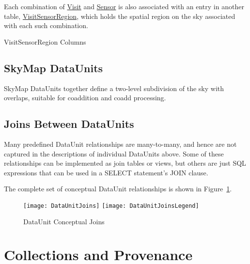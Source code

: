 \documentclass[DM,toc]{lsstdoc}
\newcommand{\tblref}[1]{\hyperref[tbl:#1]{#1}}
\newcommand{\unitref}[1]{\hyperref[unit:#1]{#1}}
\newcommand{\coltable}[1]{
    \begin{table}[htb]
        {
            \footnotesize
            
        }
        \caption{#1 Columns}
        \label{tbl:#1}
    \end{table}
}
\newcommand{\unitinc}[1]{}
\newcommand{\joininc}[1]{}
\begin{document}
Each combination of \unitref{Visit} and \unitref{Sensor} is also associated with an entry in another table, \tblref{VisitSensorRegion}, which holds the spatial region on the sky associated with each such combination.

\unitinc{Camera}
\unitinc{PhysicalFilter}
\unitinc{Sensor}
\unitinc{Exposure}
\unitinc{Visit}
\coltable{VisitSensorRegion}
\unitinc{ExposureRange}

\subsection{SkyMap DataUnits}
\label{sec:skymap-dataunits}

SkyMap DataUnits together define a two-level subdivision of the sky with overlaps, suitable for coaddition and coadd processing.

\unitinc{SkyMap}
\unitinc{Tract}
\unitinc{Patch}

\subsection{Joins Between DataUnits}
\label{sec:joins-between-dataunits}

Many predefined DataUnit relationships are many-to-many, and hence are not captured in the descriptions of individual DataUnits above.
Some of these relationships can be implemented as join tables or views, but others are just SQL expressions that can be used in a SELECT statement's JOIN clause.

The complete set of conceptual DataUnit relationships is shown in Figure~\ref{fig:DataUnitJoins}.

\begin{figure}
    \centering
    \texttt{[image: DataUnitJoins]}
    \texttt{[image: DataUnitJoinsLegend]}
    \caption{DataUnit Conceptual Joins}
    \label{fig:DataUnitJoins}
\end{figure}

\joininc{ExposureRangeJoin}
\joininc{MultiCameraExposureJoin}
\joininc{VisitSensorSkyPixJoin}
\joininc{VisitSkyPixJoin}
\joininc{PatchSkyPixJoin}
\joininc{TractSkyPixJoin}
\joininc{VisitSensorPatchJoin}
\joininc{VisitPatchJoin}
\joininc{VisitSensorTractJoin}
\joininc{VisitTractJoin}

\section{Collections and Provenance}
\label{sec:collections-and-provenance}
\end{document}
